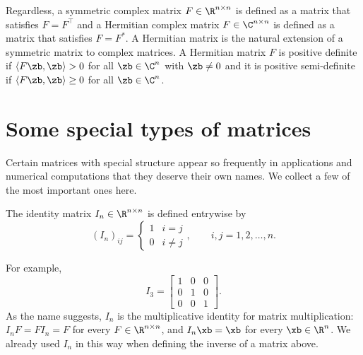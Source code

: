 Regardless, a symmetric complex matrix $F \in \R^{n \times n}$ is defined as a matrix that satisfies $F = F^\top$ and a Hermitian complex matrix $F \in \C^{n \times n}$ is defined as a matrix that satisfies $F = F^*$. A Hermitian matrix is the natural extension of a symmetric matrix to complex matrices. A Hermitian matrix $F$ is positive definite if $\langle F \zb, \zb \rangle > 0$ for all $\zb \in \C^n$ with $\zb \neq 0$ and it is positive semi-definite if $\langle F \zb, \zb \rangle \ge 0$ for all $\zb \in \C^n$.


\section{Some special types of matrices}

Certain matrices with special structure appear so frequently in applications and numerical computations that they deserve their own names. We collect a few of the most important ones here.

\begin{definition}
    The identity matrix $I_n \in \R^{n \times n}$ is defined entrywise by
    \begin{equation*}
        (I_n)_{ij} = \begin{cases} 1 & i = j \\ 0 & i \neq j \end{cases}, \qquad i,j = 1,2,\ldots,n.
    \end{equation*}
\end{definition}
For example,
\begin{equation*}
    I_3 = \begin{bmatrix}
        1 & 0 & 0 \\
        0 & 1 & 0 \\
        0 & 0 & 1
    \end{bmatrix}.
\end{equation*}
As the name suggests, $I_n$ is the multiplicative identity for matrix multiplication: $I_n F = F I_n = F$ for every $F \in \R^{n \times n}$, and $I_n \xb = \xb$ for every $\xb \in \R^n$. We already used $I_n$ in this way when defining the inverse of a matrix above.

